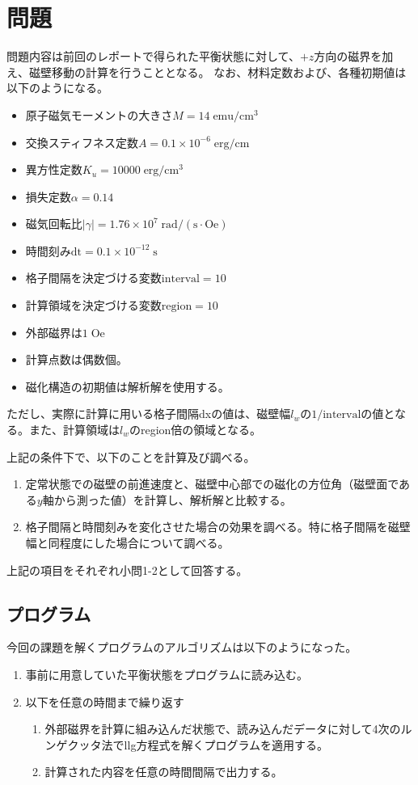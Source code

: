 \documentclass{jsarticle}
\begin{document}
\section{問題}
問題内容は前回のレポートで得られた平衡状態に対して、$+z$方向の磁界を加え、磁壁移動の計算を行うこととなる。
なお、材料定数および、各種初期値は以下のようになる。
\begin{itemize}
	\item 原子磁気モーメントの大きさ$M = 14\;\mathrm{emu/cm^3}$
	\item 交換スティフネス定数$A = 0.1\times 10^{-6}\;\mathrm{erg/cm}$
	\item 異方性定数$K_u = 10000\;\mathrm{erg/cm^3}$
	\item 損失定数$\alpha = 0.14$
	\item 磁気回転比$\lvert\gamma\rvert = 1.76\times 10^7\;\mathrm{rad/(s\cdot Oe)}$
	\item 時間刻み$\mathrm{dt} = 0.1\times 10^{-12}\;\mathrm{s}$
	\item 格子間隔を決定づける変数$\mathrm{interval} = 10$
	\item 計算領域を決定づける変数$\mathrm{region} = 10$
	\item 外部磁界は$1\;\mathrm{Oe}$
	\item 計算点数は偶数個。
	\item 磁化構造の初期値は解析解を使用する。
\end{itemize}

ただし、実際に計算に用いる格子間隔dxの値は、磁壁幅$l_w$の$1/\mathrm{interval}$の値となる。また、計算領域は$l_w$のregion倍の領域となる。

上記の条件下で、以下のことを計算及び調べる。
\begin{enumerate}
	\item 定常状態での磁壁の前進速度と、磁壁中心部での磁化の方位角（磁壁面である$y$軸から測った値）を計算し、解析解と比較する。
	\item 格子間隔と時間刻みを変化させた場合の効果を調べる。特に格子間隔を磁壁幅と同程度にした場合について調べる。
\end{enumerate}

上記の項目をそれぞれ小問1-2として回答する。

\subsection{プログラム}
今回の課題を解くプログラムのアルゴリズムは以下のようになった。
\begin{enumerate}
	\item 事前に用意していた平衡状態をプログラムに読み込む。
	\item 以下を任意の時間まで繰り返す
	\begin{enumerate}
		\item 外部磁界を計算に組み込んだ状態で、読み込んだデータに対して4次のルンゲクッタ法でllg方程式を解くプログラムを適用する。
		\item 計算された内容を任意の時間間隔で出力する。
	\end{enumerate}
\end{enumerate}
\end{document}

